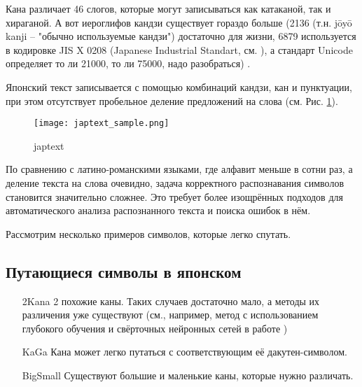 Кана различает 46 слогов, которые могут записываться как катаканой, так и хираганой. А вот иероглифов кандзи существует гораздо больше (2136 (т.н. jōyō kanji -- "обычно используемые кандзи") достаточно для жизни, 6879 используется в кодировке JIS X 0208 (Japanese Industrial Standart, см. \cite{JISX0208}), а стандарт Unicode определяет то ли 21000, то ли 75000, надо разобраться) .

Японский текст записывается с помощью комбинаций кандзи, кан и пунктуации, при этом отсутствует пробельное деление предложений на слова (см. Рис. \cref{fig:japtext_sample}).
	\begin{figure}[H]
	\centering
	\texttt{[image: japtext\_sample.png]}
	\caption{japtext}
	\label{fig:japtext_sample}
\end{figure}

По сравнению с латино-романскими языками, где алфавит меньше в сотни раз, а деление текста на слова очевидно, задача корректного распознавания символов становится значительно сложнее. Это требует более изощрённых подходов для автоматического анализа распознанного текста и поиска ошибок в нём.

Рассмотрим несколько примеров символов, которые легко спутать.

\subsection{ Путающиеся символы в японском }

\begin{itemize}
	\item[2Kana] 2 похожие каны. Таких случаев достаточно мало, а методы их различения уже существуют (см., например, метод с использованием глубокого обучения и свёрточных нейронных сетей в работе \cite{tsai:dcnn})
	\begin{figure}[H]
	\end{figure}

	\item[KaGa] Кана может легко путаться с соответствующим её дакутен-символом.
	\begin{figure}[H]
	\end{figure}

	\item[BigSmall] Существуют большие и маленькие каны, которые нужно различать.
	\begin{figure}[H]
	\end{figure}
	
\end{itemize}

